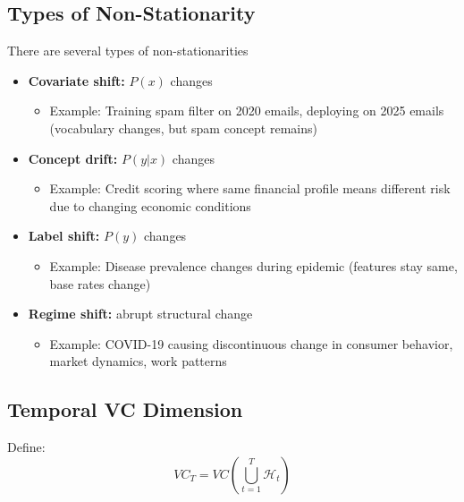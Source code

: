   \subsection*{Types of Non-Stationarity}

  There are several types of non-stationarities

  \begin{itemize}
    \item \textbf{Covariate shift:} $P(x)$ changes
      \begin{itemize}
        \item Example: Training spam filter on 2020 emails, deploying on
          2025 emails (vocabulary changes, but spam concept remains)
      \end{itemize}

    \item \textbf{Concept drift:} $P(y|x)$ changes
      \begin{itemize}
        \item Example: Credit scoring where same financial profile means
          different risk due to changing economic conditions
      \end{itemize}

    \item \textbf{Label shift:} $P(y)$ changes
      \begin{itemize}
        \item Example: Disease prevalence changes during epidemic (features
          stay same, base rates change)
      \end{itemize}

    \item \textbf{Regime shift:} abrupt structural change
      \begin{itemize}
        \item Example: COVID-19 causing discontinuous change in consumer
          behavior, market dynamics, work patterns
      \end{itemize}
  \end{itemize}

  \subsection*{Temporal VC Dimension}

  Define:
  \[
    VC_{T}= VC\left(\bigcup_{t=1}^{T}\mathcal{H}_{t}\right)
  \]

